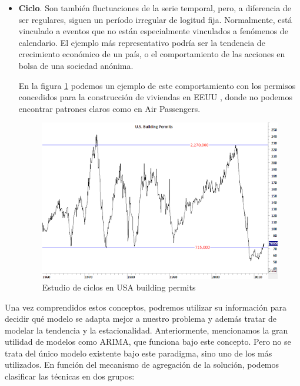 \begin{itemize}
    \item \textbf{Ciclo}. Son también fluctuaciones de la serie temporal, pero, a diferencia de ser regulares, siguen un período irregular de logitud fija. Normalmente, está vinculado a eventos que no están especialmente vinculados a fenómenos de calendario. El ejemplo más representativo podría ser la tendencia de crecimiento económico de un país, o el comportamiento de las acciones en bolsa de una sociedad anónima.

    En la figura \ref{ciclo} podemos un ejemplo de este comportamiento con los permisos concedidos para la construcción de viviendas en EEUU \cite{techcharts2012housing}, donde no podemos encontrar patrones claros como en Air Passengers.

    \begin{figure}[H] %
        \centering
        \includegraphics[scale=0.55]{img/ciclo}
        \caption{Estudio de ciclos en USA building permits}
        \label{ciclo}
    \end{figure}

\end{itemize}

Una vez comprendidos estos conceptos, podremos utilizar su información para decidir qué modelo se adapta mejor a nuestro problema y además tratar de modelar la tendencia y la estacionalidad. Anteriormente, mencionamos la gran utilidad de modelos como ARIMA, que funciona bajo este concepto. Pero no se trata del único modelo existente bajo este paradigma, sino uno de los más utilizados. En función del mecanismo de agregación de la solución, podemos clasificar las técnicas en dos grupos:

